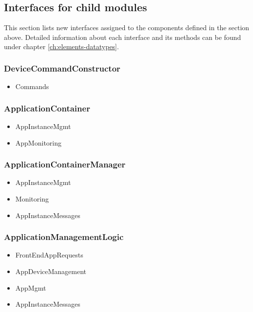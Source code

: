 \subsection{Interfaces for child modules}
    This section lists new interfaces assigned to the components defined
    in the section above. Detailed information about each interface and
    its methods can be found under chapter \ref{ch:elements-datatypes}. \\

    \subsubsection{DeviceCommandConstructor}
        \begin{itemize}
            \item Commands
        \end{itemize}

   \subsubsection{ApplicationContainer}
        \begin{itemize}
            \item AppInstanceMgmt
            \item AppMonitoring
        \end{itemize}

    \subsubsection{ApplicationContainerManager}
        \begin{itemize}
            \item AppInstanceMgmt
            \item Monitoring
            \item AppInstanceMessages
        \end{itemize}

    \subsubsection{ApplicationManagementLogic}
        \begin{itemize}
            \item FrontEndAppRequests
            \item AppDeviceManagement
            \item AppMgmt
            \item AppInstanceMessages
        \end{itemize}


